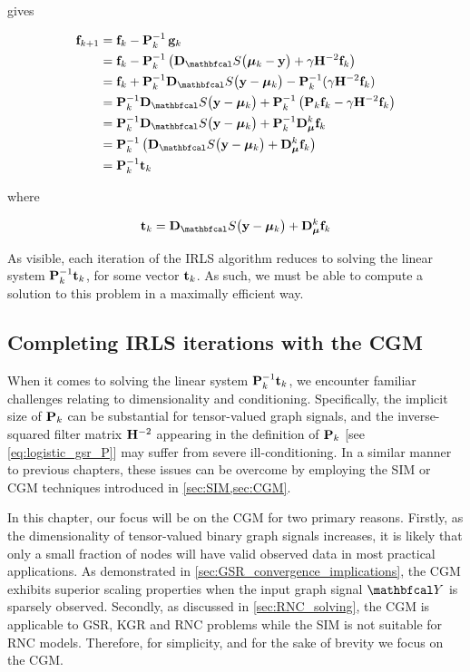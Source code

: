 gives

\begin{align*}
    \f_{k+1} &= \f_k - \PP^{-1}_k \, \g_k\\
    &= \f_{k} - \PP^{-1}_k \left(\D_\St \big(\muu_k - \y\big) + \gamma \HH^{-2} \f_k\right) \\
    &= \f_k + \PP^{-1}_k \D_\St \big(\y - \muu_k\big) - \PP^{-1}_k (\gamma \HH^{-2} \f_k) \\
    &= \PP^{-1}_k \D_\St \big(\y - \muu_k \big) + \PP^{-1}_k \left(\PP_k \f_k - \gamma \HH^{-2} \f_k\right) \\
    &= \PP^{-1}_k \D_\St \big(\y - \muu_k \big) + \PP^{-1}_k \D_{\muu}^k\f_k  \\
    &= \PP^{-1}_k \left(\D_\St \big(\y - \muu_k \big) + \D_{\muu}^k\f_k \right) \\
    &= \PP^{-1}_k \tee_k
\end{align*}

where

\begin{equation}
    \tee_k = \D_\St \big(\y - \muu_k\big) + \D_{\muu}^k \f_k
\end{equation}

As visible, each iteration of the IRLS algorithm reduces to solving the linear system $\mathbf{P}^{-1}_k \mathbf{t}_k$, for some vector $\mathbf{t}_k$. As such, we must be able to compute a solution to this problem in a maximally efficient way. 


\subsection{Completing IRLS iterations with the CGM}

When it comes to solving the linear system $\mathbf{P}^{-1}_k \mathbf{t}_k$, we encounter familiar challenges relating to dimensionality and conditioning. Specifically, the implicit size of $\mathbf{P}_k$ can be substantial for tensor-valued graph signals, and the inverse-squared filter matrix $\mathbf{H}^{-2}$ appearing in the definition of $\mathbf{P}_k$ [see \cref{eq:logistic_gsr_P}] may suffer from severe ill-conditioning. In a similar manner to previous chapters, these issues can be overcome by employing the SIM or CGM techniques introduced in \cref{sec:SIM,sec:CGM}.

In this chapter, our focus will be on the CGM for two primary reasons. Firstly, as the dimensionality of tensor-valued binary graph signals increases, it is likely that only a small fraction of nodes will have valid observed data in most practical applications. As demonstrated in \cref{sec:GSR_convergence_implications}, the CGM exhibits superior scaling properties when the input graph signal $\Yt$ is sparsely observed. Secondly, as discussed in \cref{sec:RNC_solving}, the CGM is applicable to GSR, KGR and RNC problems while the SIM is not suitable for RNC models. Therefore, for simplicity, and for the sake of brevity we focus on the CGM. 

